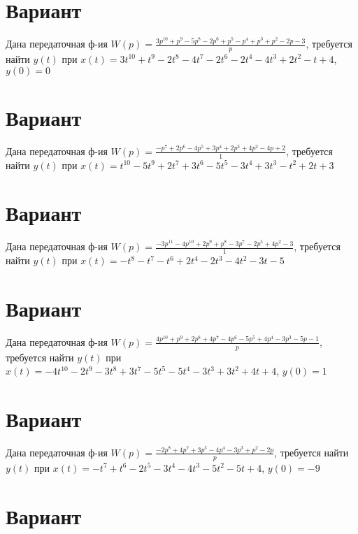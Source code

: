 \documentclass{article}
\begin{document}
\section{Вариант}

Дана передаточная ф-ия $W(p)=\frac{3p^{10}+p^{9}-5p^{8}-2p^{6}+p^{5}-p^{4}+p^{3}+p^{2}-2p-3}{p}$, требуется найти $y(t)$ при $x(t)=3t^{10}+t^{9}-2t^{8}-4t^{7}-2t^{6}-2t^{4}-4t^{3}+2t^{2}-t+4$, $y(0)=0$



\section{Вариант}

Дана передаточная ф-ия $W(p)=\frac{-p^{7}+2p^{6}-4p^{5}+3p^{4}+2p^{3}+4p^{2}-4p+2}{1}$, требуется найти $y(t)$ при $x(t)=t^{10}-5t^{9}+2t^{7}+3t^{6}-5t^{5}-3t^{4}+3t^{3}-t^{2}+2t+3$



\section{Вариант}

Дана передаточная ф-ия $W(p)=\frac{-3p^{11}-4p^{10}+2p^{9}+p^{8}-3p^{7}-2p^{5}+4p^{2}-3}{1}$, требуется найти $y(t)$ при $x(t)=-t^{8}-t^{7}-t^{6}+2t^{4}-2t^{3}-4t^{2}-3t-5$



\section{Вариант}

Дана передаточная ф-ия $W(p)=\frac{4p^{10}+p^{9}+2p^{8}+4p^{7}-4p^{6}-5p^{5}+4p^{4}-3p^{3}-5p-1}{p}$, требуется найти $y(t)$ при $x(t)=-4t^{10}-2t^{9}-3t^{8}+3t^{7}-5t^{5}-5t^{4}-3t^{3}+3t^{2}+4t+4$, $y(0)=1$



\section{Вариант}

Дана передаточная ф-ия $W(p)=\frac{-2p^{8}+4p^{7}+3p^{5}-4p^{4}-3p^{3}+p^{2}-2p}{p}$, требуется найти $y(t)$ при $x(t)=-t^{7}+t^{6}-2t^{5}-3t^{4}-4t^{3}-5t^{2}-5t+4$, $y(0)=-9$



\section{Вариант}
\end{document}
